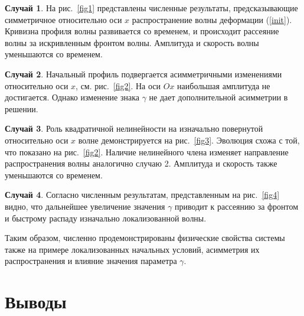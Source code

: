 \textbf {Случай 1}. На рис.~\ref {fig1} представлены численные результаты, предсказывающие симметричное относительно оси $ x $  распространение волны деформации (\ref {init}). Кривизна профиля волны развивается со временем, и происходит рассеяние волны за искривленным фронтом волны. Амплитуда и скорость волны уменьшаются со временем.

\textbf {Случай 2}. Начальный профиль подвергается асимметричными изменениями относительно оси $ x $, см. рис.~\ref{fig2}. На оси $ Ox $ наибольшая амплитуда не достигается. Однако изменение знака $ \gamma $ не дает дополнительной асимметрии в решении.

\textbf {Случай 3}. Роль квадратичной нелинейности на изначально повернутой относительно оси $x$ волне демонстрируется на рис.~\ref{fig3}. Эволюция схожа с той, что показано на рис.~\ref {fig2}. Наличие нелинейного члена изменяет направление распространения волны аналогично случаю 2. Амплитуда и скорость также уменьшаются со временем.

\textbf {Случай 4}. Согласно численным результатам, представленным на рис.~\ref{fig4} видно, что дальнейшее увеличение значения $ \gamma $ приводит к рассеянию за фронтом и быстрому распаду изначально локализованной волны.

Таким образом, численно продемонстрированы физические свойства системы также на примере локализованных начальных условий, асимметрия их распространения и влияние значения параметра $\gamma$. 

\section{Выводы}




